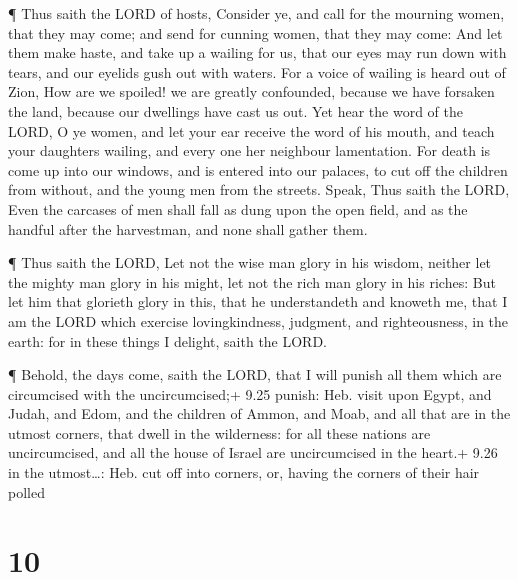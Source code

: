  ¶ Thus saith the LORD of hosts, Consider ye, and call for
the mourning women, that they may come; and send for cunning women, that
they may come:  And let them make haste, and take up a
wailing for us, that our eyes may run down with tears, and our eyelids
gush out with waters.  For a voice of wailing is heard out
of Zion, How are we spoiled! we are greatly confounded, because we have
forsaken the land, because our dwellings have cast us out. 
Yet hear the word of the LORD, O ye women, and let your ear receive the
word of his mouth, and teach your daughters wailing, and every one her
neighbour lamentation.  For death is come up into our
windows, and is entered into our palaces, to cut off the children from
without, and the young men from the streets.  Speak, Thus
saith the LORD, Even the carcases of men shall fall as dung upon the
open field, and as the handful after the harvestman, and none shall
gather them.

 ¶ Thus saith the LORD, Let not the wise man glory in his
wisdom, neither let the mighty man glory in his might, let not the rich
man glory in his riches:  But let him that glorieth glory
in this, that he understandeth and knoweth me, that I am the LORD which
exercise lovingkindness, judgment, and righteousness, in the earth: for
in these things I delight, saith the LORD.

 ¶ Behold, the days come, saith the LORD, that I will
punish all them which are circumcised with the uncircumcised;+ 9.25
punish: Heb. visit upon  Egypt, and Judah, and Edom, and
the children of Ammon, and Moab, and all that are in the utmost corners,
that dwell in the wilderness: for all these nations are uncircumcised,
and all the house of Israel are uncircumcised in the heart.+ 9.26 in the
utmost\ldots: Heb. cut off into corners, or, having the corners of their
hair polled

\hypertarget{section-9}{%
\section{10}\label{section-9}}


